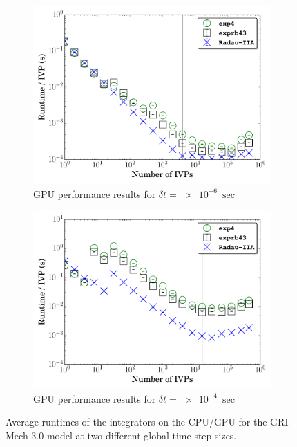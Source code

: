 \documentclass[final,twocolumn]{elsarticle}
\begin{document}
\begin{figure}[htb]
  \begin{subfigure}{0.49\textwidth}
      \includegraphics[width=\linewidth]{CH4_1e-06_gpu.pdf}
      \caption{GPU performance results for $\delta t = \SI{e-6}{\sec}$}
      \label{F:ch4_gpu_perf_small}
  \end{subfigure}
  \begin{subfigure}{0.49\textwidth}
      \includegraphics[width=\linewidth]{CH4_1e-04_gpu.pdf}
      \caption{GPU performance results for $\delta t = \SI{e-4}{\sec}$}
      \label{F:ch4_gpu_perf_large}
  \end{subfigure}
  \caption{Average runtimes of the integrators on the CPU\slash GPU for the GRI-Mech 3.0 model at two different global time-step sizes.}
  \label{F:CH4_perf}
\end{figure}
\end{document}
